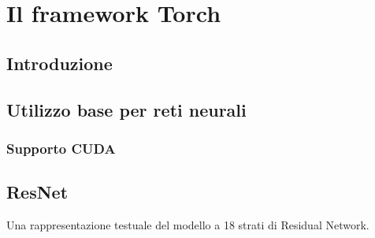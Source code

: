 
\chapter{Il framework Torch} %

\label{AppendixB} %
\section{Introduzione}
\parencite{WTorch}

\section{Utilizzo base per reti neurali}

\subsection{Supporto CUDA}

\section{ResNet}
Una rappresentazione testuale del modello a 18 strati di Residual Network. 

